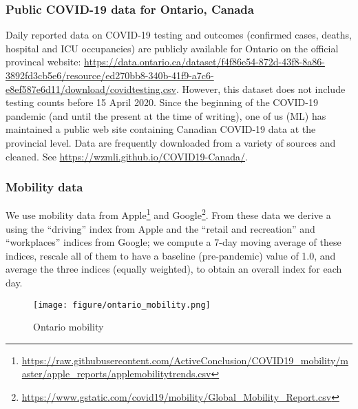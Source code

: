 \documentclass[12pt]{article}\usepackage[]{graphicx}\usepackage[]{color}
\begin{document}
\subsubsection*{Public COVID-19 data for Ontario, Canada}

Daily reported data on COVID-19 testing and outcomes (confirmed cases, deaths, hospital and ICU occupancies) are publicly available for Ontario on the official provincal website:
\url{https://data.ontario.ca/dataset/f4f86e54-872d-43f8-8a86-3892fd3cb5e6/resource/ed270bb8-340b-41f9-a7c6-e8ef587e6d11/download/covidtesting.csv}.
However, this dataset does not include testing counts before 15 April 2020.  Since the beginning of the COVID-19 pandemic (and until the present at the time of writing), one of us (ML) has maintained a public web site containing Canadian COVID-19 data at the provincial level.  Data are frequently downloaded from a variety of sources and cleaned.  See \url{https://wzmli.github.io/COVID19-Canada/}.

\hypertarget{Mobility data}{}
\subsubsection*{Mobility data}

We use mobility data from Apple\footnote{\url{https://raw.githubusercontent.com/ActiveConclusion/COVID19_mobility/master/apple_reports/applemobilitytrends.csv}} and Google\footnote{\url{https://www.gstatic.com/covid19/mobility/Global_Mobility_Report.csv}}.  From these data we derive a  using the ``driving'' index from Apple and the ``retail and recreation'' and ``workplaces'' indices from Google; we compute a 7-day moving average of these indices, rescale all of them to have a baseline (pre-pandemic) value of 1.0, and average the three indices (equally weighted), to obtain an overall index for each day.


\begin{figure}[ht!]
\texttt{[image: figure/ontario\_mobility.png]}

\caption{Ontario mobility }
\label{fig:Ont_mobility}
\end{figure}
\end{document}
